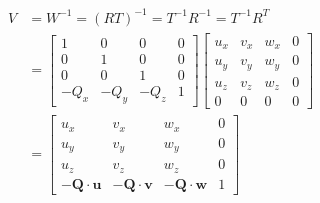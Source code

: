 \documentclass[11pt,a4paper,oldfontcommands]{memoir}
\begin{document}
{\begin{flushleft}
\begin{align*}
V&=W^{-1}=(RT)^{-1}=T^{-1}R^{-1}=T^{-1}R^{T} \\
&=\begin{bmatrix}
1 & 0 & 0 & 0\\
0 & 1 & 0 & 0\\
0 & 0 & 1 & 0\\
-Q_{x} & -Q_{y} & -Q_{z} & 1
\end{bmatrix}
\begin{bmatrix}
u_{x} & v_{x} & w_{x} & 0\\
u_{y} & v_{y} & w_{y} & 0\\
u_{z} & v_{z} & w_{z} & 0\\
0 & 0 & 0 & 0
\end{bmatrix} \\
&=\begin{bmatrix}
u_{x} & v_{x} & w_{x} & 0\\
u_{y} & v_{y} & w_{y} & 0\\
u_{z} & v_{z} & w_{z} & 0\\
\mathbf{-Q\cdot u} & \mathbf{-Q\cdot v} & \mathbf{-Q\cdot w} & 1
\end{bmatrix}
\end{align*}


\end{flushleft}}
\end{document}
